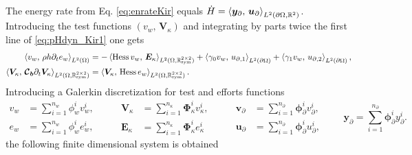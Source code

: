 The energy rate from Eq. \eqref{eq:enrateKir} equals $\dot{H} = \inner[L^2(\partial\Omega, \mathbb{R}^2)]{\bm{y}_\partial}{\bm{u}_\partial}$. Introducing the test functions $(v_w,\, \bm{V}_\kappa)$ and integrating by parts twice the first line of \eqref{eq:pHdyn_Kir1} one gets 
\begin{equation}
\begin{aligned}
\inner[L^2(\Omega)]{v_w}{\rho h \partial_t e_w} &= -\inner[L^2(\Omega, \mathbb{R}^{2\times 2}_{\text{sym}})]{\Hess v_w}{\bm{E}_\kappa} + \inner[L^2(\partial\Omega)]{\gamma_0 v_w}{{u}_{\partial, 1}} + \inner[L^2(\partial\Omega)]{\gamma_1 v_w}{{u}_{\partial, 2}}, \\
\inner[L^2(\Omega, \mathbb{R}^{2\times 2}_{\text{sym}})]{\bm{V}_\kappa}{\bm{\mathcal{C}_b} \partial_t \bm{V}_\kappa} &= \inner[L^2(\Omega, \mathbb{R}^{2\times 2}_{\text{sym}})]{\bm{V}_\kappa}{\Hess e_w}. \\
\end{aligned}
\end{equation}
Introducing a Galerkin discretization for test and efforts functions
\begin{equation}
\begin{aligned}
v_w &= \sum_{i = 1}^{n_w} \phi_w^i v_w^i, \\
e_w &= \sum_{i = 1}^{n_w} \phi_w^i e_w^i,
\end{aligned} \qquad
\begin{aligned}
\bm{V}_\kappa &= \sum_{i = 1}^{n_\kappa} \bm\Phi_\kappa^i v_\kappa^i, \\
\bm{E}_\kappa &= \sum_{i = 1}^{n_\kappa} \bm\Phi_\kappa^i e_\kappa^i
\end{aligned} \qquad
\begin{aligned}
\bm{v}_\partial &= \sum_{i = 1}^{n_\partial} \bm\phi_\partial^i v_\partial^i, \\
\bm{u}_\partial &= \sum_{i = 1}^{n_\partial} \bm\phi_\partial^i u_\partial^i,
\end{aligned} \qquad
\bm{y}_\partial = \sum_{i = 1}^{n_\partial} \bm\phi_\partial^i y_\partial^i.
\end{equation} 
the following finite dimensional system is obtained
